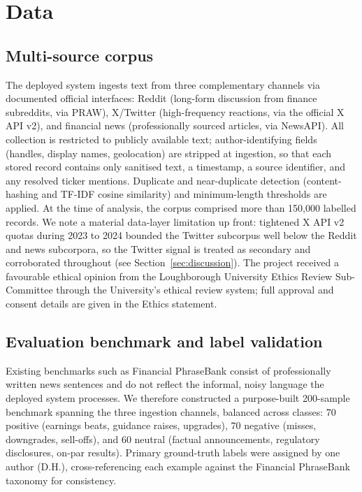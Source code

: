 \documentclass{aims}
\numberwithin{equation}{section}
\begin{document}
\section{Data}\label{sec:data}
\subsection{Multi-source corpus}
The deployed system ingests text from three complementary channels via documented
official interfaces: Reddit (long-form discussion from finance subreddits, via
PRAW), X/Twitter (high-frequency reactions, via the official X API v2), and
financial news (professionally sourced articles, via NewsAPI). All collection is
restricted to publicly available text; author-identifying fields (handles, display
names, geolocation) are stripped at ingestion, so that each stored record contains
only sanitised text, a timestamp, a source identifier, and any resolved ticker
mentions. Duplicate and near-duplicate detection (content-hashing and TF-IDF
cosine similarity) and minimum-length thresholds are applied. At the time of
analysis, the corpus comprised more than 150{,}000 labelled records. We note a
material data-layer limitation up front: tightened X API v2 quotas during
2023 to 2024 bounded the Twitter subcorpus well below the Reddit and news
subcorpora, so the Twitter signal is treated as secondary and corroborated
throughout (see Section~\ref{sec:discussion}). The project received a favourable
ethical opinion from the Loughborough University Ethics Review Sub-Committee through
the University's ethical review system; full approval and consent details are given
in the Ethics statement.

\subsection{Evaluation benchmark and label validation}\label{sec:benchmark}
Existing benchmarks such as Financial PhraseBank \citep{malo2014} consist of
professionally written news sentences and do not reflect the informal, noisy
language the deployed system processes. We therefore constructed a purpose-built
200-sample benchmark spanning the three ingestion channels, balanced across
classes: 70 positive (earnings beats, guidance raises, upgrades), 70 negative
(misses, downgrades, sell-offs), and 60 neutral (factual announcements, regulatory
disclosures, on-par results). Primary ground-truth labels were assigned by one
author (D.H.), cross-referencing each example against the Financial PhraseBank
taxonomy for consistency.
\end{document}
